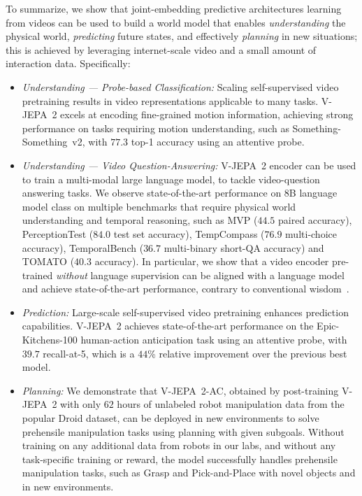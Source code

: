 \documentclass[]{fairmeta}
\newcommand{\model}{V-JEPA~2\xspace}
\newcommand{\acModel}{V-JEPA~2-AC\xspace}
\begin{document}
To summarize, we show that joint-embedding predictive architectures learning from videos can be used to build a world model that enables \emph{understanding} the physical world, \emph{predicting} future states, and effectively \emph{planning} in new situations; this is achieved by leveraging internet-scale video and a small amount of interaction data.
Specifically:
\begin{itemize}


\item \textit{Understanding --- Probe-based Classification:} Scaling self-supervised video pretraining results in video representations applicable to many tasks. \model excels at encoding fine-grained motion information, achieving strong performance on tasks requiring motion understanding, such as Something-Something~v2, with $77.3$ top-1 accuracy using an attentive probe. 


\item \textit{Understanding --- Video Question-Answering:} \model encoder can be used to train a multi-modal large language model, to tackle video-question answering tasks. We observe state-of-the-art performance on 8B language model class on multiple benchmarks that require physical world understanding and temporal reasoning, such as MVP ($44.5$ paired accuracy), PerceptionTest ($84.0$ test set accuracy), TempCompass ($76.9$ multi-choice accuracy), TemporalBench ($36.7$ multi-binary short-QA accuracy) and TOMATO ($40.3$ accuracy).  In particular, we show that a video encoder pre-trained \textit{without} language supervision can be aligned with a language model and achieve state-of-the-art performance, contrary to conventional wisdom~\citep{yuan2025tarsier2, wang2024internvideo2}.

\item \textit{Prediction:} Large-scale self-supervised video pretraining enhances prediction capabilities.  \model achieves state-of-the-art performance on the Epic-Kitchens-100 human-action anticipation task using an attentive probe, with $39.7$ recall-at-5, which is a $44$\% relative improvement over the previous best model.

\item \textit{Planning:} We demonstrate that \acModel, obtained by post-training \model with only $62$ hours of unlabeled robot manipulation data from the popular Droid dataset, can be deployed in new environments to solve prehensile manipulation tasks using planning with given subgoals.
Without training on any additional data from robots in our labs, and without any task-specific training or reward, the model successfully handles prehensile manipulation tasks, such as Grasp and Pick-and-Place with novel objects and in new environments.
\end{itemize}
\end{document}
